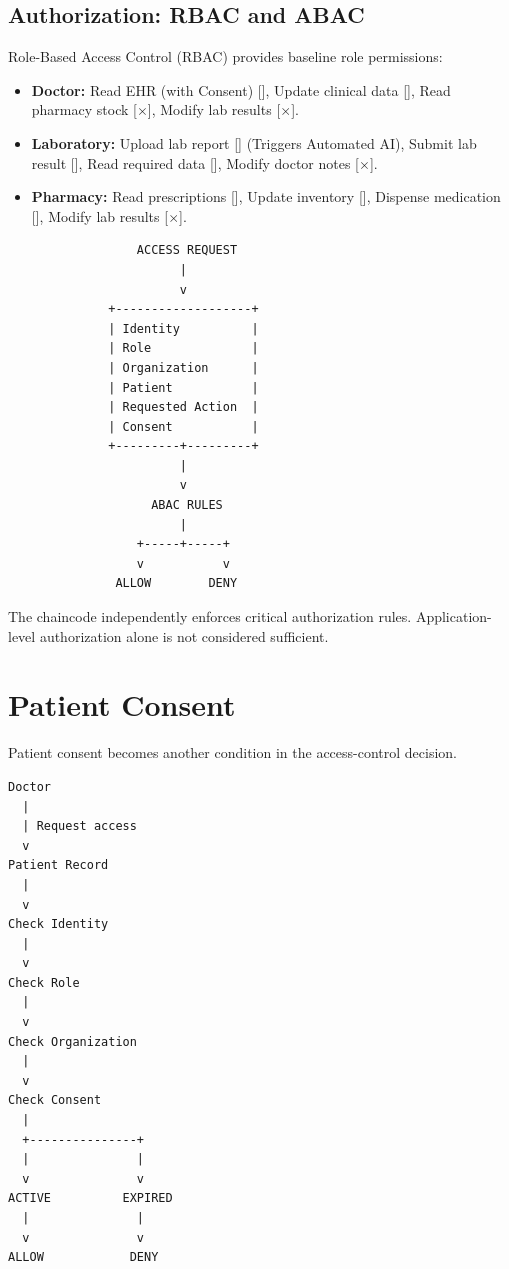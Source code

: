 \documentclass[11pt,a4paper]{article}
\begin{document}
\subsection{Authorization: RBAC and ABAC}
Role-Based Access Control (RBAC) provides baseline role permissions:
\begin{itemize}
    \item \textbf{Doctor:} Read EHR (with Consent) [\checkmark], Update clinical data [\checkmark], Read pharmacy stock [$\times$], Modify lab results [$\times$].
    \item \textbf{Laboratory:} Upload lab report [\checkmark] (Triggers Automated AI), Submit lab result [\checkmark], Read required data [\checkmark], Modify doctor notes [$\times$].
    \item \textbf{Pharmacy:} Read prescriptions [\checkmark], Update inventory [\checkmark], Dispense medication [\checkmark], Modify lab results [$\times$].
\end{itemize}

\begin{lstlisting}
                  ACCESS REQUEST
                        |
                        v
              +-------------------+
              | Identity          |
              | Role              |
              | Organization      |
              | Patient           |
              | Requested Action  |
              | Consent           |
              +---------+---------+
                        |
                        v
                    ABAC RULES
                        |
                  +-----+-----+
                  v           v
               ALLOW        DENY
\end{lstlisting}

The chaincode independently enforces critical authorization rules. Application-level authorization alone is not considered sufficient.

\newpage
\section{Patient Consent}

Patient consent becomes another condition in the access-control decision.

\begin{lstlisting}
Doctor
  |
  | Request access
  v
Patient Record
  |
  v
Check Identity
  |
  v
Check Role
  |
  v
Check Organization
  |
  v
Check Consent
  |
  +---------------+
  |               |
  v               v
ACTIVE          EXPIRED
  |               |
  v               v
ALLOW            DENY
\end{lstlisting}
\end{document}
